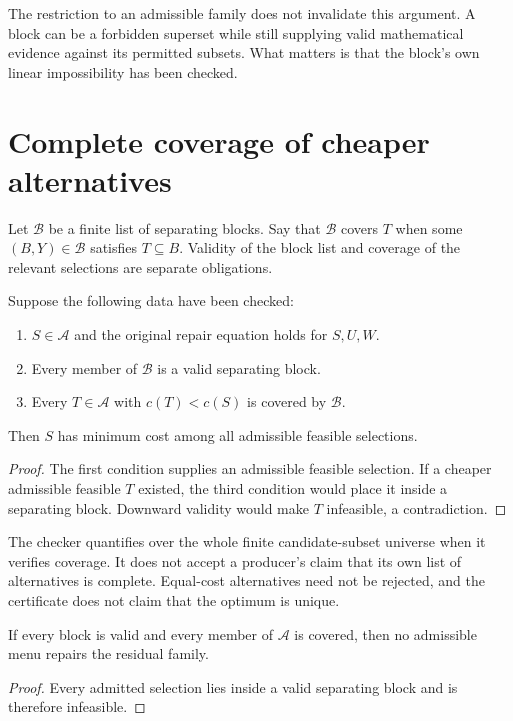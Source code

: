 The restriction to an admissible family does not invalidate this argument. A block can be a forbidden superset while still supplying valid mathematical evidence against its permitted subsets. What matters is that the block's own linear impossibility has been checked.

\section{Complete coverage of cheaper alternatives}

Let $\mathcal B$ be a finite list of separating blocks. Say that $\mathcal B$ covers $T$ when some $(B,Y)\in\mathcal B$ satisfies $T\subseteq B$. Validity of the block list and coverage of the relevant selections are separate obligations.

\begin{theorem}
Suppose the following data have been checked:
\begin{enumerate}
 \item $S\in\mathcal A$ and the original repair equation holds for $S,U,W$.
 \item Every member of $\mathcal B$ is a valid separating block.
 \item Every $T\in\mathcal A$ with $c(T)<c(S)$ is covered by $\mathcal B$.
\end{enumerate}
Then $S$ has minimum cost among all admissible feasible selections.
\end{theorem}
\begin{proof}
The first condition supplies an admissible feasible selection. If a cheaper admissible feasible $T$ existed, the third condition would place it inside a separating block. Downward validity would make $T$ infeasible, a contradiction.
\end{proof}

The checker quantifies over the whole finite candidate-subset universe when it verifies coverage. It does not accept a producer's claim that its own list of alternatives is complete. Equal-cost alternatives need not be rejected, and the certificate does not claim that the optimum is unique.

\begin{theorem}
If every block is valid and every member of $\mathcal A$ is covered, then no admissible menu repairs the residual family.
\end{theorem}
\begin{proof}
Every admitted selection lies inside a valid separating block and is therefore infeasible.
\end{proof}


